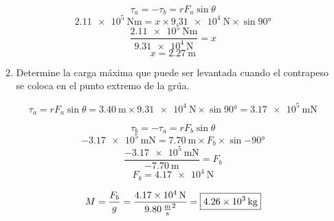 \documentclass[Análisis.root.tex]{subfiles}
\begin{document}
\begin{enumerate}
\begin{enumerate}
                \[\tau_a=-\tau_b=rF_a\sin{\theta}\]
                \[\SI{2,11e5}{\newton\meter}=x\times\SI{9,31e4}{\newton}\times\sin{\ang{90}}\]
                \[\frac{\SI{2,11e5}{\newton\meter}}{\SI{9,31e4}{\newton}}=x\]
                \[x=\boxed{\SI{2,27}{\meter}}\]

          \item Determine la carga máxima que puede ser levantada cuando el contrapeso se coloca en el punto extremo de la grúa.

                \[
                  \tau_a=rF_a\sin{\theta}
                  =\SI{3,40}{\meter}\times\SI{9,31e4}{\newton}\times\sin{\ang{90}}
                  =\SI{3,17e5}{\meter\newton}
                \]

                \[\tau_b=-\tau_a=rF_b\sin{\theta}\]
                \[\SI{-3,17e5}{\meter\newton}=\SI{7,70}{\meter}\times F_b\times\sin{\ang{-90}}\]
                \[\frac{\SI{-3,17e5}{\meter\newton}}{\SI{-7,70}{\meter}}=F_b\]
                \[F_b=\SI{4,17e4}{\newton}\]

                \[
                  M=\frac{F_b}{g}
                  =\frac{\SI{4,17e4}{\newton}}{\SI{9,80}{\meter\over\second\squared}}
                  =\boxed{\SI{4,26e3}{\kilogram}}
                \]
        \end{enumerate}
\end{enumerate}
\end{document}

